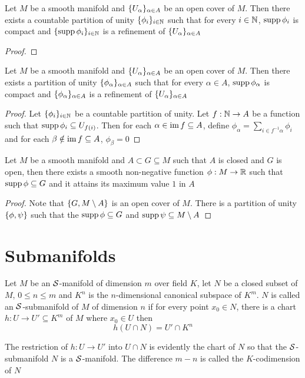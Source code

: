 \begin{theorem}
	Let $M$ be a smooth manifold and $\{U_\alpha\}_{\alpha \in A}$ be an open cover of $M$. Then there exists a countable partition of unity $\{\phi_i\}_{i \in \mathbb{N}}$
	such that for every $i \in \mathbb{N}$, $\operatorname{supp} \phi_i$ is compact and $\{\operatorname{supp} \phi_i\}_{i \in \mathbb{N}}$ is a refinement of $\{U_\alpha\}_{\alpha \in A}$
	\begin{proof}
	\end{proof}
\end{theorem}

\begin{theorem}
	Let $M$ be a smooth manifold and $\{U_\alpha\}_{\alpha \in A}$ be an open cover of $M$. Then there exists a partition of unity $\{\phi_\alpha\}_{\alpha \in A}$ such that for every $\alpha \in A$, $\operatorname{supp} \phi_\alpha$ is compact and $\{\phi_\alpha\}_{\alpha \in A}$ is a refinement of $\{U_\alpha\}_{\alpha \in A}$
	\begin{proof}
		Let $\{\phi_i\}_{i \in \mathbb{N}}$ be a countable partition of unity. Let $f: \mathbb{N} \to A$ be a function such that $\operatorname{supp} \phi_i \subseteq U_{f(i)}$. Then for each $\alpha \in \operatorname{im} f \subseteq A$, define $\phi_\alpha = \sum_{i \in f^{-1} \alpha} \phi_i$ and for each $\beta \notin \operatorname{im} f \subseteq A$, $\phi_\beta = 0$
	\end{proof}
\end{theorem}


\begin{corollary}
	Let $M$ be a smooth manifold and $A \subset G \subseteq M$ such that $A$ is closed and $G$ is open, then there exists a smooth non-negative function $\phi: M \to \mathbb{R}$ such that $\operatorname{supp} \phi \subseteq G$ and it attains its maximum value $1$ in $A$
	\begin{proof}
		Note that $\{G, M \setminus A\}$ is an open cover of $M$. There is a partition of unity $\{\phi, \psi\}$ such that the $\operatorname{supp} \phi \subseteq G$ and $\operatorname{supp} \psi \subseteq M \setminus A$
	\end{proof}
\end{corollary}

\section{Submanifolds}

\begin{definition}
	Let $M$ be an $\mathcal{S}$-manifold of dimension $m$ over field $K$, let $N$ be a closed subset of $M$, $0 \leq n \leq m$ and $K^n$ is the $n$-dimensional canonical subspace of $K^m$. $N$ is called an $\mathcal{S}$-submanifold of $M$ of dimension $n$ if for every point $x_0 \in N$, there is a chart $h: U \to U' \subseteq K^m$ of $M$ where $x_0 \in U$ then
	$$
	h(U \cap N) = U' \cap K^n
	$$
	
	The restriction of $h: U \to U'$ into $U \cap N$ is evidently the chart of $N$ so that the $\mathcal{S}$-submanifold $N$ is a $\mathcal{S}$-manifold. The difference $m-n$ is called the $K$-codimension of $N$
\end{definition}

